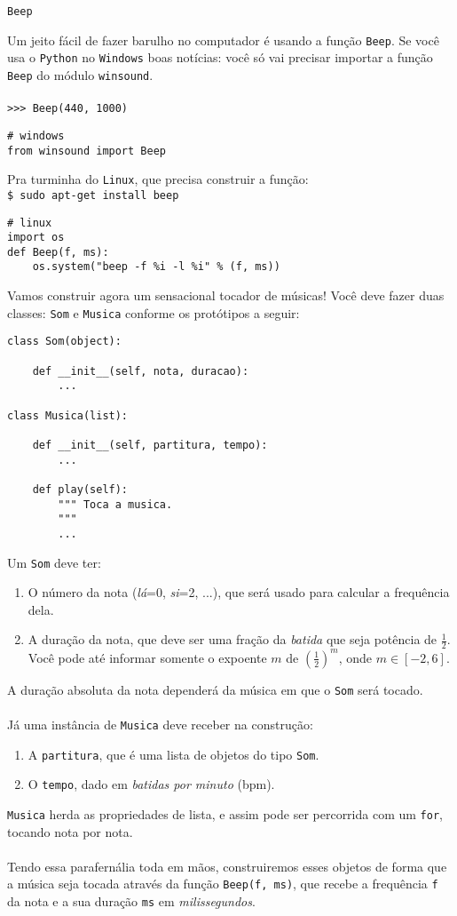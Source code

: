 \documentclass[12pt]{article}
\begin{document}
	\begin{interlude}{\texttt{Beep}}
	
	Um jeito fácil de fazer barulho no computador é usando a função \texttt{Beep}. Se você usa o \texttt{Python} no \texttt{Windows} boas notícias: você só vai precisar importar a função \texttt{Beep} do módulo \texttt{winsound}.\\
	\\
	\texttt{>>> Beep(440, 1000)}
	\begin{lstlisting}
# windows
from winsound import Beep
	\end{lstlisting}
	Pra turminha do \texttt{Linux}, que precisa construir a função: \\
	\texttt{\$ sudo apt-get install beep}
	\begin{lstlisting}
# linux
import os
def Beep(f, ms):
    os.system("beep -f %i -l %i" % (f, ms))
	\end{lstlisting}
	
	\end{interlude}
	
	Vamos construir agora um sensacional tocador de músicas! Você deve fazer duas classes: \texttt{Som} e \texttt{Musica} conforme os protótipos a seguir:
	
	\begin{lstlisting}
class Som(object):

    def __init__(self, nota, duracao):
        ...
        
class Musica(list):

    def __init__(self, partitura, tempo):
        ...
        
    def play(self):
        """ Toca a musica.
        """
        ...
	\end{lstlisting}
	Um \texttt{Som} deve ter:
	\begin{enumerate}
		\item O número da nota (\emph{lá}=0, \emph{si}=2, ...), que será usado para calcular a frequência dela.
		\item A duração da nota, que deve ser uma fração da \emph{batida} que seja potência de $\frac{1}{2}$. Você pode até informar somente o expoente $m$ de $(\frac{1}{2})^{m}$, onde $m \in [-2, 6]$.
	\end{enumerate}
	A duração absoluta da nota dependerá da música em que o \texttt{Som} será tocado.
	\\ \\
	Já uma instância de \texttt{Musica} deve receber na construção:
	\begin{enumerate}
		\item A \texttt{partitura}, que é uma lista de objetos do tipo \texttt{Som}.
		\item O \texttt{tempo}, dado em \emph{batidas por minuto} (bpm).
	\end{enumerate}
	\texttt{Musica} herda as propriedades de lista, e assim pode ser percorrida com um \texttt{for}, tocando nota por nota.
	\\ \\
	Tendo essa parafernália toda em mãos, construiremos esses objetos de forma que a música seja tocada através da função \texttt{Beep(f, ms)}, que recebe a frequência \texttt{f} da nota e a sua duração \texttt{ms} em \emph{milissegundos}.
\end{document}
